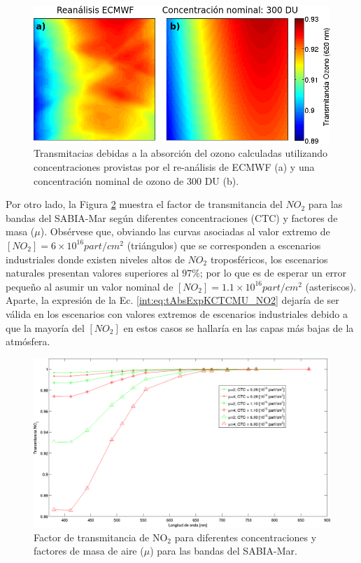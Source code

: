     \begin{figure}
    \centering
    \includegraphics[width=\textwidth]{int/figures/O3_ECMWF_VS_NOM.png}
    \caption[Transmitacias debidas a la absorción del ozono a partir de concentración otorgada por ECMWF y de 300 DU (nominal).]{Transmitacias debidas a la absorción del ozono calculadas utilizando concentraciones provistas por el re-análisis de ECMWF (a) y una concentración nominal de ozono de 300 DU (b).}
    \label{int:O3_ECMWF_VS_NOM}
    \end{figure}

    Por otro lado, la Figura \ref{int:NO2} muestra el factor de transmitancia del $NO_{2}$ para las bandas del SABIA-Mar según diferentes concentraciones (CTC) y factores de masa ($\mu$). Obsérvese que, obviando las curvas asociadas al valor extremo de $[NO_{2}] = 6\times10^{16} part/cm^{2}$ (triángulos) que se corresponden a escenarios industriales donde existen niveles altos de $NO_{2}$ troposféricos, los escenarios naturales presentan valores superiores al $97\%$; por lo que es de esperar un error pequeño al asumir un valor nominal de $[NO_{2}] = 1.1\times10^{16} part/cm^{2}$ (asteriscos). Aparte, la expresión de la Ec. \ref{int:eq:tAbsExpKCTCMU_NO2} dejaría de ser válida en los escenarios con valores extremos de escenarios industriales debido a que la mayoría del $[NO_{2}]$ en estos casos se hallaría en las capas más bajas de la atmósfera.

    \begin{figure}
    \centering
    \includegraphics[width=\textwidth]{int/figures/NO2.png}
    \caption[Factor de transmitancia de NO$_{2}$ para diferentes concentraciones y factores de masa de aire.]{Factor de transmitancia de NO$_{2}$ para diferentes concentraciones y factores de masa de aire ($\mu$) para las bandas del SABIA-Mar.}
    \label{int:NO2}
    \end{figure}
    
